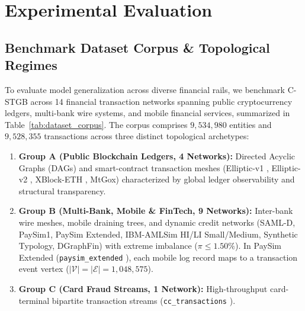 \section{Experimental Evaluation}
\label{sec:experiments}

\subsection{Benchmark Dataset Corpus \& Topological Regimes}
\label{sec:dataset_corpus}
To evaluate model generalization across diverse financial rails, we benchmark C-STGB across 14 financial transaction networks spanning public cryptocurrency ledgers, multi-bank wire systems, and mobile financial services, summarized in Table~\ref{tab:dataset_corpus}. The corpus comprises $9,534,980$ entities and $9,528,355$ transactions across three distinct topological archetypes:
\begin{enumerate}
    \item \textbf{Group A (Public Blockchain Ledgers, 4 Networks):} Directed Acyclic Graphs (DAGs) and smart-contract transaction meshes (Elliptic-v1 \citep{weber2019anti}, Elliptic-v2 \citep{bellei2024elliptic2}, XBlock-ETH \citep{zheng2020xblock}, MtGox) characterized by global ledger observability and structural transparency.
    \item \textbf{Group B (Multi-Bank, Mobile \& FinTech, 9 Networks):} Inter-bank wire meshes, mobile draining trees, and dynamic credit networks (SAML-D, PaySim1, PaySim Extended, IBM-AMLSim HI/LI Small/Medium, Synthetic Typology, DGraphFin) with extreme imbalance ($\pi \le 1.50\%$). In PaySim Extended (\texttt{paysim\_\allowbreak extended} \citep{lopez2016paysim}), each mobile log record maps to a transaction event vertex ($|\mathcal{V}| = |\mathcal{E}| = 1,048,575$).
    \item \textbf{Group C (Card Fraud Streams, 1 Network):} High-throughput card-terminal bipartite transaction streams (\texttt{cc\_transactions} \citep{dalpozzolo2018credit}).
\end{enumerate}

